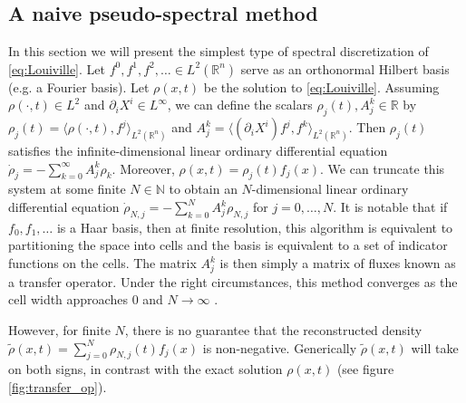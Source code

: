 \documentclass[a4paper, 12 pt]{amsart}
\newcommand{\R}{\mathbb{R}}
\begin{document}
\subsection{A naive pseudo-spectral method}
\label{sec:naive}
  In this section we will present the simplest type of
  spectral discretization of \eqref{eq:Louiville}.
  Let $f^0,f^1,f^2,\dots \in L^2(\R^n)$ serve as an
  orthonormal Hilbert basis (e.g. a Fourier basis).
  Let $\rho(x,t)$ be the solution to \eqref{eq:Louiville}.
  Assuming $\rho(\cdot,t) \in L^2$ and $\partial_i X^i \in L^{\infty}$,
  we can define the scalars $\rho_j(t), A^k_j \in \R$
  by $\rho_j(t) = \langle \rho(\cdot ,t) , f^j \rangle_{L^2(\R^n)}$
  and $A^k_j = \langle (\partial_i X^i) f^j , f^k \rangle_{L^2(\R^n)}$.
  Then $\rho_j(t)$ satisfies the infinite-dimensional linear
  ordinary differential equation
  $
    \dot{\rho}_j = - \sum_{k=0}^{\infty}A^k_j \rho_k
  $.
  Moreover, $\rho(x,t) = \rho_j(t) f_j(x)$.
  We can truncate this system at some finite $N \in \mathbb{N}$
  to obtain an $N$-dimensional linear ordinary differential equation
  $\dot{\rho}_{N,j} = -\sum_{k=0}^{N} A^k_j \rho_{N,j}$ for $j=0,\dots,N$.
  It is notable that if $f_0,f_1,\dots$ is a Haar basis, then
  at finite resolution, this algorithm is equivalent to 
  partitioning the space into cells and the basis is equivalent
  to a set of indicator functions on the cells.
  The matrix $A^k_j$ is then simply a matrix of fluxes 
  known as a transfer operator.
  Under the right circumstances,
  this method converges as the cell width approaches $0$ and $N \to \infty$
  \cite{FroylandJungeKoltai2013}.

  However, for finite $N$, there is no guarantee that the reconstructed
  density $\tilde{\rho}(x,t) = \sum_{j=0}^N \rho_{N,j}(t) f_j(x)$
  is non-negative. 
  Generically $\tilde{\rho}(x,t)$ will take on both signs, in
  contrast with the exact solution $\rho(x,t)$ (see figure \ref{fig:transfer_op}).
  
\end{document}
